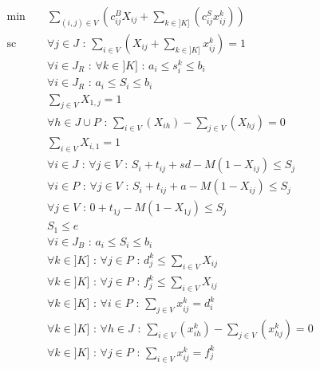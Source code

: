 \documentclass[12pt,a4paper,fleqn]{article}
\begin{document}
\begin{align}
& \text{min } && \sum \limits_{(i,j) \in V} (c^B_{ij}X_{ij} + \sum \limits_{k \in ]K]}( c^S_{ij}x^k_{ij})) \\[10pt]
& \text{sc }  && \forall j \in J \text{ : } \sum \limits_{i \in V}( X_{ij} + \sum \limits_{k \in ]K]} x^k_{ij} ) = 1 \label{tousservis} \\
& && \forall i \in J_R \text{ : } \forall k \in ]K] \text{ : } a_i \leqslant s_i^k \leqslant b_i \label{fenetrerestant1} \\
& && \forall i \in J_R \text{ : } a_i \leqslant S_i \leqslant b_i \label{fenetrerestant2} \\[30pt]
& && \sum \limits_{j \in V} X_{1,j} = 1 \label{partirdudepot} \\
& && \forall h \in J \cup P \text{ : } \sum \limits_{i \in V} (X_{ih}) - \sum \limits_{j \in V} (X_{hj}) = 0 \label{flotgros} \\
& && \sum \limits_{i \in V} X_{i,1} = 1 \label{reveniraudepot} \\
& && \forall i \in J \text{ : } \forall j \in V \text{ : } S_i + t_{ij} + sd - M(1-X_{ij}) \leqslant S_j \label{sequentialitegros1} \\
& && \forall i \in P \text{ : } \forall j \in V \text{ : } S_i + t_{ij} + a - M(1-X_{ij}) \leqslant S_j \label{sequentialitegros2} \\
& && \forall j \in V \text{ : } 0 + t_{1j} - M(1-X_{1j}) \leqslant S_j \label{sequentialitegros3} \\
& && S_{1} \leqslant e \label{findejournee} \\
& && \forall i \in J_B \text{ : } a_i \leqslant S_i \leqslant b_i \label{fenetregros} \\[30pt]
& && \forall k \in ]K] \text{ : } \forall j \in P \text{ : } d^k_j \leqslant \sum \limits_{i \in V} X_{ij} \label{separationvalide} \\
& && \forall k \in ]K] \text{ : } \forall j \in P \text{ : } f^k_j \leqslant \sum \limits_{i \in V} X_{ij} \label{mergevalide} \\
& && \forall k \in ]K] \text{ : } \forall i \in P \text{ : } \sum \limits_{j \in V} x^k_{ij} = d^k_i \label{partirdugros} \\
& && \forall k \in ]K] \text{ : } \forall h \in J \text{ : } \sum \limits_{i \in V} (x_{ih}^k) - \sum \limits_{j \in V} (x_{hj}^k) = 0 \label{flotpetit} \\
& && \forall k \in ]K] \text{ : } \forall j \in P \text{ : } \sum \limits_{i \in V} x^k_{ij} = f^k_j \label{reveniraugros} \\

\end{align}
\end{document}
